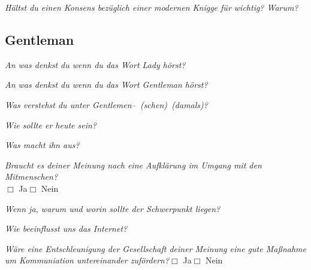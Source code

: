 \documentclass[a4paper,12pt]{scrartcl}
\newcommand{\checkbox}{\(\Box\)}
\newcommand{\frage}[1]{\textit{#1}}
\begin{document}
\frage{Hältst du einen Konsens bezüglich einer modernen Knigge für wichtig? Warum?}
\vspace{3cm}
\newpage
\subsection*{Gentleman}

\frage{An was denkst du wenn du das Wort Lady hörst?}
\vspace{3cm}

\frage{An was denkst du wenn du das Wort Gentleman hörst?}
\vspace{3cm}

\frage{Was verstehst du unter Gentlemen--\ (schen)\ (damals)?}
\vspace{2cm} 

\frage{Wie sollte er heute sein?}
\vspace{2cm}

\frage{Was macht ihn aus?}
\vspace{2cm}

\newpage
\frage{Braucht es deiner Meinung nach eine Aufklärung im Umgang mit den Mitmenschen?}\\
\checkbox{} Ja\hspace{0.8cm}\checkbox{} Nein \par
\frage{Wenn ja, warum und worin sollte der Schwerpunkt liegen?}
\vspace{3cm}

\frage{Wie beeinflusst uns das Internet?}
\vspace{4cm}

\frage{Wäre eine Entschleunigung der Gesellschaft deiner Meinung eine gute Maßnahme um Kommuniation untereinander zufördern?}\hfill\checkbox{} Ja\hspace{0.8cm}\checkbox{} Nein
\end{document}
